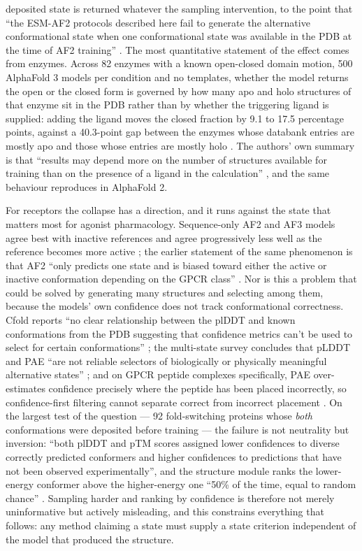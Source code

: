 deposited state is returned whatever the sampling intervention, to the point that ``the ESM-AF2
protocols described here fail to generate the alternative conformational state when one
conformational state was available in the PDB at the time of AF2 training''
\citep[p.~11]{swapna2025memorization}. The most quantitative statement of the effect comes from enzymes.
Across 82 enzymes with a known open-closed domain motion, 500 AlphaFold 3 models per condition and
no templates, whether the model returns the open or the closed form is governed by how many apo and
holo structures of that enzyme sit in the PDB rather than by whether the triggering ligand is
supplied: adding the ligand moves the closed fraction by 9.1 to 17.5 percentage points, against a
40.3-point gap between the enzymes whose databank entries are mostly apo and those whose entries are
mostly holo \citep[Discussion]{yu2026domainmotion}. The authors' own summary is that ``results may depend
more on the number of structures available for training than on the presence of a ligand in the
calculation'' \citep[Significance]{yu2026domainmotion}, and the same behaviour reproduces in AlphaFold 2.

For receptors the collapse has a direction, and it runs against the state that matters most for
agonist pharmacology. Sequence-only AF2 and AF3 models agree best with inactive references and
agree progressively less well as the reference becomes more active \citep{chib2025gpcrstates}; the
earlier statement of the same phenomenon is that AF2 ``only predicts one state and is biased toward
either the active or inactive conformation depending on the GPCR class'' \citep[p.~1873]{heo2022multistate}.
Nor is this a problem that could be solved by generating many structures and selecting among them,
because the models' own confidence does not track conformational correctness. Cfold reports ``no
clear relationship between the plDDT and known conformations from the PDB suggesting that
confidence metrics can't be used to select for certain conformations'' \citep[p.~5]{bryant2024cfold}; the
multi-state survey concludes that pLDDT and PAE ``are not reliable selectors of biologically or
physically meaningful alternative states'' \citep[p.~15]{ye2026multistatebias}; and on GPCR peptide
complexes specifically, PAE over-estimates confidence precisely where the peptide has been placed
incorrectly, so confidence-first filtering cannot separate correct from incorrect placement
\citep{junker2026peptidedesign}. On the largest test of the question --- 92 fold-switching proteins
whose \emph{both} conformations were deposited before training --- the failure is not neutrality but
inversion: ``both plDDT and pTM scores assigned lower confidences to diverse correctly predicted
conformers and higher confidences to predictions that have not been observed experimentally'', and
the structure module ranks the lower-energy conformer above the higher-energy one ``50\% of the
time, equal to random chance'' \citep{chakravarty2024memorization}. Sampling harder and ranking by
confidence is therefore not merely uninformative but actively misleading, and this constrains
everything that follows: any method claiming a state must supply a state criterion independent of
the model that produced the structure.

